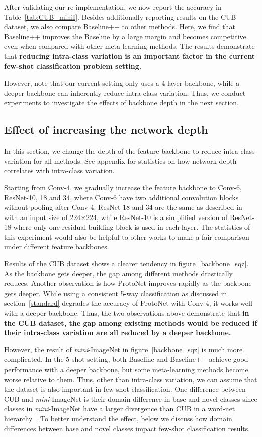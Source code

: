 After validating our re-implementation, we now report the accuracy in Table~\ref{tab:CUB_miniI}. Besides additionally reporting results on the CUB dataset, we also compare Baseline++ to other methods. Here, we find that Baseline++ improves the Baseline by a large margin and becomes competitive even when compared with other meta-learning methods. The results demonstrate that \textbf{reducing intra-class variation is an important factor in the current few-shot classification problem setting.}

However, note that our current setting only uses a 4-layer backbone, while a deeper backbone can inherently reduce intra-class variation. Thus, we conduct experiments to investigate the effects of backbone depth in the next section.

\subsection{Effect of increasing the network depth}
\label{sec:backbone}

In this section, we change the depth of the feature backbone to reduce intra-class variation for all methods. See appendix for statistics on how network depth correlates with intra-class variation.  

Starting from Conv-4, we gradually increase the feature backbone to Conv-6, ResNet-10, 18 and 34, where Conv-6 have two additional convolution blocks without pooling after Conv-4. ResNet-18 and 34 are the same as described in \cite{he2016deep} with an input size of 224$\times$224, while ResNet-10 is a simplified version of ResNet-18 where only one residual building block is used in each layer. The statistics of this experiment would also be helpful to other works to make a fair comparison under different feature backbones.  

Results of the CUB dataset shows a clearer tendency in figure~\ref{backbone_sqz}. As the backbone gets deeper, the gap among different methods drastically reduces. Another observation is how ProtoNet improves rapidly as the backbone gets deeper. While using a consistent 5-way classification as discussed in section~\ref{standard} degrades the accuracy of ProtoNet with Conv-4, it works well with a deeper backbone. Thus, the two observations above demonstrate that \textbf{in the CUB dataset, the gap among existing methods would be reduced if their intra-class variation are all reduced by a deeper backbone.}

However, the result of \emph{mini}-ImageNet  in figure~\ref{backbone_sqz} is much more complicated. In the 5-shot setting, both Baseline and Baseline++ achieve good performance with a deeper backbone, but some meta-learning methods become worse relative to them. Thus, other than intra-class variation, we can assume that the dataset is also important in few-shot classification. One difference between CUB and \emph{mini}-ImageNet  is their domain difference in base and novel classes since classes in \emph{mini}-ImageNet  have a larger divergence than CUB in a word-net hierarchy~\cite{miller1995wordnet}. To better understand the effect, below we discuss how domain differences between base and novel classes impact few-shot classification results. 

